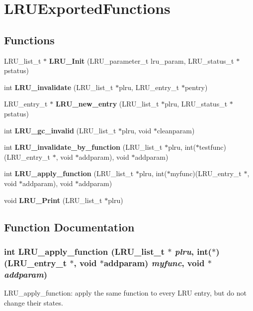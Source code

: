 \section{LRUExported\-Functions}
\label{group__LRUExportedFunctions}
\subsection*{Functions}
\begin{CompactItemize}
\item 
LRU\_\-list\_\-t $\ast$ {\bf LRU\_\-Init} (LRU\_\-parameter\_\-t lru\_\-param, LRU\_\-status\_\-t $\ast$pstatus)
\item 
int {\bf LRU\_\-invalidate} (LRU\_\-list\_\-t $\ast$plru, LRU\_\-entry\_\-t $\ast$pentry)
\item 
LRU\_\-entry\_\-t $\ast$ {\bf LRU\_\-new\_\-entry} (LRU\_\-list\_\-t $\ast$plru, LRU\_\-status\_\-t $\ast$pstatus)
\item 
int {\bf LRU\_\-gc\_\-invalid} (LRU\_\-list\_\-t $\ast$plru, void $\ast$cleanparam)
\item 
int {\bf LRU\_\-invalidate\_\-by\_\-function} (LRU\_\-list\_\-t $\ast$plru, int($\ast$testfunc)(LRU\_\-entry\_\-t $\ast$, void $\ast$addparam), void $\ast$addparam)
\item 
int {\bf LRU\_\-apply\_\-function} (LRU\_\-list\_\-t $\ast$plru, int($\ast$myfunc)(LRU\_\-entry\_\-t $\ast$, void $\ast$addparam), void $\ast$addparam)
\item 
void {\bf LRU\_\-Print} (LRU\_\-list\_\-t $\ast$plru)
\end{CompactItemize}


\subsection{Function Documentation}
\subsubsection{\setlength{\rightskip}{0pt plus 5cm}int LRU\_\-apply\_\-function (LRU\_\-list\_\-t $\ast$ {\em plru}, int($\ast$)(LRU\_\-entry\_\-t $\ast$, void $\ast$addparam) {\em myfunc}, void $\ast$ {\em addparam})}\label{group__LRUExportedFunctions_ga5}


LRU\_\-apply\_\-function: apply the same function to every LRU entry, but do not change their states.

